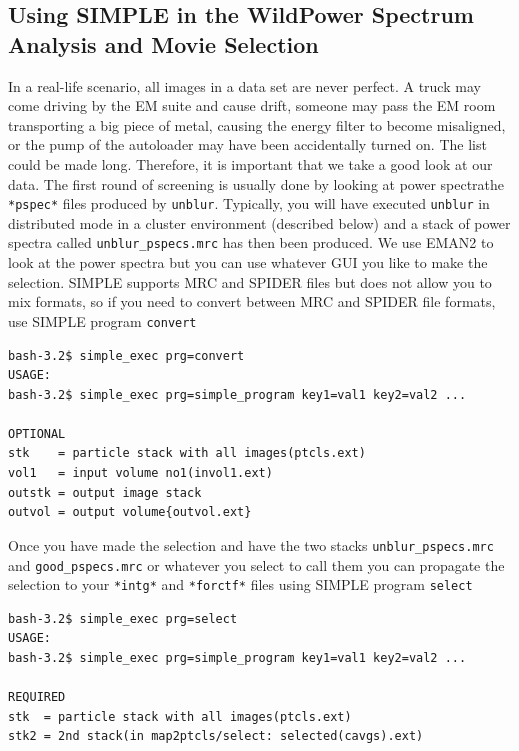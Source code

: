 \documentclass[a4paper,11pt]{article}
\newcommand{\prgname}[1]{\textcolor{NavyBlue}{\texttt{#1}}}
\begin{document}
\begin{tcolorbox}[breakable,colback=white,colframe=orange,width=\dimexpr\textwidth+12mm\relax,enlarge left by=-6mm]
\subsection{Using SIMPLE in the Wild\textemdash{}Power Spectrum Analysis and Movie Selection}
In a real-life scenario, all images in a data set are never perfect. A truck may come driving by the EM suite and cause drift, someone may pass the EM room transporting a big piece of metal, causing the energy filter to become misaligned, or the pump of the autoloader may have been accidentally turned on. The list could be made long. Therefore, it is important that we take a good look at our data. The first round of screening is usually done by looking at power spectra\textemdash{}the \texttt{*pspec*} files produced by \prgname{unblur}. Typically, you will have executed \texttt{unblur} in distributed mode in a cluster environment (described below) and a stack of power spectra called \texttt{unblur\_pspecs.mrc} has then been produced. We use EMAN2 to look at the power spectra but you can use whatever GUI you like to make the selection. SIMPLE supports MRC and SPIDER files but does not allow you to mix formats, so if you need to convert between MRC and SPIDER file formats, use SIMPLE program \prgname{convert}
\begin{verbatim}
bash-3.2$ simple_exec prg=convert
USAGE:
bash-3.2$ simple_exec prg=simple_program key1=val1 key2=val2 ...

OPTIONAL
stk    = particle stack with all images(ptcls.ext)
vol1   = input volume no1(invol1.ext)
outstk = output image stack
outvol = output volume{outvol.ext}
\end{verbatim}
Once you have made the selection and have the two stacks \texttt{unblur\_pspecs.mrc} and \texttt{good\_pspecs.mrc} or whatever you select to call them you can propagate the selection to your \texttt{*intg*} and \texttt{*forctf*} files using SIMPLE program \prgname{select}
\begin{verbatim}
bash-3.2$ simple_exec prg=select
USAGE:
bash-3.2$ simple_exec prg=simple_program key1=val1 key2=val2 ...

REQUIRED
stk  = particle stack with all images(ptcls.ext)
stk2 = 2nd stack(in map2ptcls/select: selected(cavgs).ext)


\end{verbatim}
\end{tcolorbox}
\end{document}
